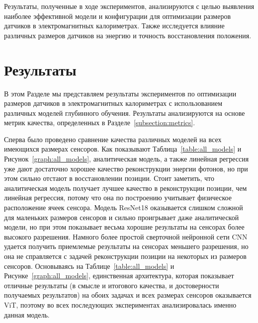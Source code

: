 \documentclass[a4paper,12pt]{extarticle}
\begin{document}
Результаты, полученные в ходе экспериментов, анализируются с целью выявления наиболее эффективной модели и конфигурации для оптимизации размеров датчиков в электромагнитных калориметрах. Также исследуется влияние различных размеров датчиков на энергию и точность восстановления положения.

\section{Результаты}
\label{section:results}

В этом Разделе мы представляем результаты экспериментов по оптимизации размеров датчиков в электромагнитных калориметрах с использованием различных моделей глубинного обучения. Результаты анализируются на основе метрик качества, определенных в Разделе~\ref{subsection:metrics}.

Сперва было проведено сравнение качества различных моделей на всех имеющихся размерах сенсоров. Как показывают Таблица~\ref{table:all_models} и Рисунок~\ref{graph:all_models}, аналитическая модель, а также линейная регрессия уже дают достаточно хорошее качество реконструкции энергии фотонов, но при этом сильно отстают в восстановлении позиции. Стоит заметить, что аналитическая модель получает лучшее качество в реконструкции позиции, чем линейная регрессия, потому что она по построению учитывает физическое расположение ячеек сенсора. Модель \textsf{ResNet18} оказывается слишком сложной для маленьких размеров сенсоров и сильно проигрывает даже аналитической модели, но при этом показывает весьма хорошие результаты на сенсорах более высокого разрешения. Намного более простой сверточной нейронной сети \textsf{CNN} удается получить приемлемые результаты на сенсорах меньшего разрешения, но она не справляется с задачей реконструкции позиции на некоторых из размеров сенсоров. Основываясь на Таблице~\ref{table:all_models} и Рисунке~\ref{graph:all_models}, единственная архитектура, которая показывает отличные результаты (в смысле и итогового качества, и достоверности получаемых результатов) на обоих задачах и всех размерах сенсоров оказывается \textsf{ViT}, поэтому во всех последующих экспериментах анализировалась именно данная модель.
\end{document}

